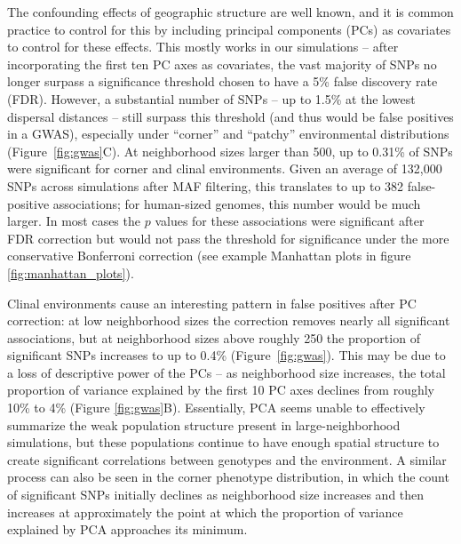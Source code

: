 \documentclass[10pt,twoside,lineno,hidelinks]{preprint} %
\begin{document}
The confounding effects of geographic structure are well known, 
and it is common practice to control for this by including principal components (PCs) as covariates to control for these effects.
This mostly works in our simulations -- after incorporating the first ten PC axes as covariates, the vast majority of SNPs no longer surpass a significance threshold chosen to have a 5\% false discovery rate (FDR).
However, a substantial number of SNPs -- up to 1.5\% at the lowest dispersal distances -- still surpass this threshold (and thus would be false positives in a GWAS),
especially under ``corner'' and ``patchy'' environmental distributions (Figure~\ref{fig:gwas}C). 
At neighborhood sizes larger than 500, up to 0.31\% of SNPs were significant for corner and clinal environments. 
Given an average of 132,000 SNPs across simulations after MAF filtering, this translates to up to 382 false-positive associations; for human-sized genomes, this number would be much larger.
In most cases the $p$ values for these associations were significant after FDR correction but would not pass the threshold for significance under the more conservative Bonferroni correction (see example Manhattan plots in figure \ref{fig:manhattan_plots}).

Clinal environments cause an interesting pattern in false positives after PC correction: at low neighborhood sizes the correction removes nearly all significant associations, 
but at neighborhood sizes above roughly 250 the proportion of significant SNPs increases to up to 0.4\% (Figure~\ref{fig:gwas}). 
This may be due to a loss of descriptive power of the PCs
-- as neighborhood size increases, the total proportion of variance explained by the first 10 PC axes declines from roughly 10\% to 4\% (Figure \ref{fig:gwas}B). 
Essentially, PCA seems unable to effectively summarize the weak population structure present in large-neighborhood simulations, but these populations continue to have enough spatial structure to create significant correlations between genotypes and the environment. A similar process can also be seen in the corner phenotype distribution, in which the count of significant SNPs initially declines as neighborhood size increases and then increases at approximately the point at which the proportion of variance explained by PCA approaches its minimum. 
\end{document}
